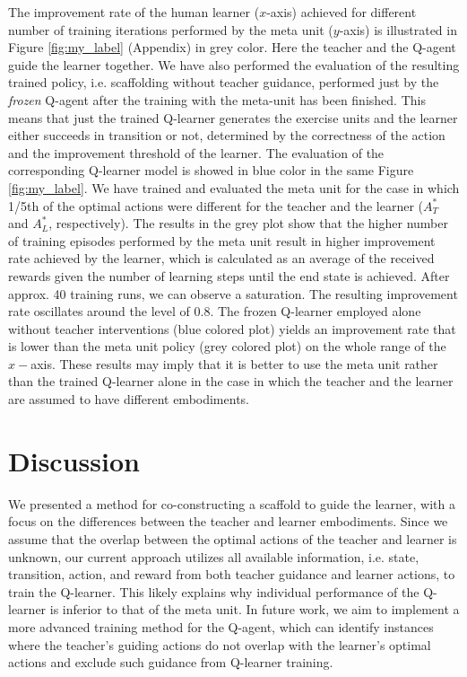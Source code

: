 \documentclass{article}
\begin{document}
The improvement rate of the human learner ($x$-axis) achieved for different number of training iterations performed by the meta unit ($y$-axis) is  illustrated in Figure \ref{fig:my_label} (Appendix) in grey color. Here the teacher and the Q-agent guide the learner together. 
We have also performed the evaluation of the resulting trained policy, i.e. scaffolding without teacher guidance, performed  just by the \textit{frozen}  Q-agent after the training with the meta-unit has been finished. This means that just the trained Q-learner generates the exercise units and the learner either succeeds in transition or not, determined by the correctness of the action and the improvement threshold of the learner. The evaluation of the corresponding Q-learner model is showed in blue color in the same Figure \ref{fig:my_label}.  We have trained and evaluated the meta unit for the case in which 1/5th of the optimal actions were different for the teacher and the learner  ($A^*_T$ and  $A^*_L$, respectively).  The results  in the grey plot show that  the higher  number of training episodes performed by the meta unit result in higher improvement rate achieved by the learner,  which is calculated as an average of the received rewards given the number of learning steps until the end state is achieved.  After approx. 40 training runs, we can observe a saturation. The resulting improvement rate oscillates around the level of 0.8.  The frozen Q-learner  employed alone without teacher interventions (blue colored plot) yields an improvement rate that is lower than the meta unit policy (grey colored plot) on the whole range of the $x-$axis.  These results may imply that it is better to use the meta unit rather than the trained Q-learner alone in the case in which the teacher and the learner are assumed to have different embodiments.  


\section{Discussion}

We presented a method for co-constructing a scaffold to guide the learner, with a focus on the differences between the teacher and learner embodiments. Since we assume that the overlap between the optimal actions of the teacher and learner is unknown, our current approach utilizes all available information, i.e. state, transition, action, and reward from both teacher guidance and learner actions, to train the Q-learner.  This likely explains why  individual performance of the Q-learner is inferior to that of the meta unit. In future work, we aim to implement a more advanced training method for the Q-agent, which can identify instances where the teacher’s guiding actions do not overlap with the learner’s optimal actions and exclude such guidance from Q-learner training.
\end{document}
